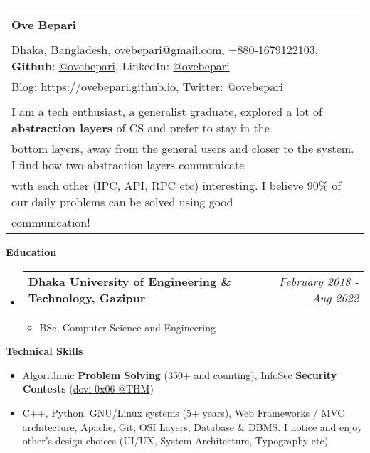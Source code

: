 \documentclass[legalpaper,10pt]{article}
\makeatletter
\newcommand{\resheading}[1]{{\large \colorbox{mygrey}{\begin{minipage}{\textwidth}{\textbf{#1 \vphantom{p\^{E}}}}\end{minipage}}}}
\newcommand{\ressubheading}[4]{
	\begin{tabular*}{7.1in}{l@{\extracolsep{\fill}}r}
		\textbf{#1} & \textit{#4} \\
	\end{tabular*}\vspace{-6pt}}
\makeatother
\begin{document}
	\begin{tabular*}{7.5in}{l@{\extracolsep{\fill}}}
		\\
		\\
		\\
		\textbf{\large Ove Bepari}\\
		\\
		Dhaka, Bangladesh, \href{mailto:ovebepari@gmail.com}{ovebepari@gmail.com}, +880-1679122103, \textbf{Github}: \href{https://github.com/ovebepari}{@ovebepari}, LinkedIn: \href{https://linkedin.com/in/ovebepari}{@ovebepari} \\
		 Blog: \url{https://ovebepari.github.io}, Twitter: \href{https://twitter.com/ovebepari}{@ovebepari}
		\\
		\\
		I am a tech enthusiast, a generalist graduate, explored a lot of \textbf{abstraction layers} of CS and prefer to stay in the\\bottom layers, away from the general users and closer to the system. I find how two abstraction layers communicate\\with each other (IPC, API, RPC etc) interesting. I believe 90\% of our daily problems can be solved using good\\ communication!
	\end{tabular*}
	
	\vspace{0.25in}
	
	\resheading{Education}
	\begin{itemize}
	
		\item \ressubheading{Dhaka University of Engineering \& Technology, Gazipur}{}{}{February 2018 - Aug 2022}
		\begin{itemize}
			\item BSc, Computer Science and Engineering
		\end{itemize}
	
	\end{itemize}
	
	\vspace{0.20in}
	
	\resheading{Technical Skills}
	\begin{itemize}
		\item Algorithmic \textbf{Problem Solving} (\href{https://www.stopstalk.com/user/profile/ovebepari}{350+ and counting}), InfoSec \textbf{Security Contests} (\href{https://tryhackme.com/p/dovi}{dovi-0x06 @THM})
		\item C++, Python, GNU/Linux systems (5+ years), Web Frameworks / MVC architecture, Apache, Git, OSI Layers, Database \& DBMS. I notice and enjoy other's design choices (UI/UX, System Architecture, Typography etc)
	\end{itemize}
\end{document}
